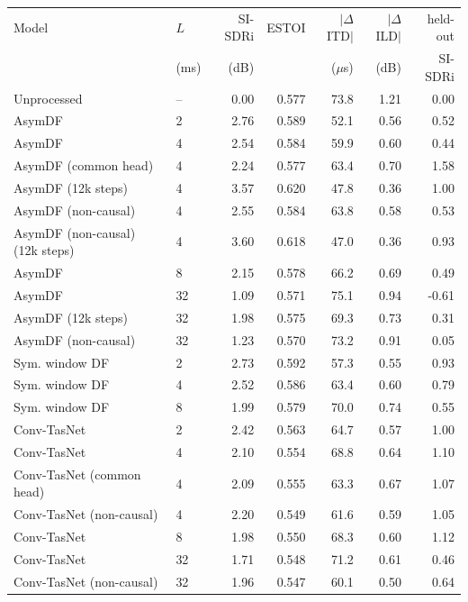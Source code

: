 \begin{tabular}{llrrrrr}
\toprule
Model & $L$ & SI-SDRi & ESTOI & $|\Delta$ITD$|$ & $|\Delta$ILD$|$ & held-out \\
 & (ms) & (dB) & & ($\mu$s) & (dB) & SI-SDRi \\
\midrule
Unprocessed & -- & 0.00 & 0.577 & 73.8 & 1.21 & 0.00 \\
AsymDF & 2 & 2.76 & 0.589 & 52.1 & 0.56 & 0.52 \\
AsymDF & 4 & 2.54 & 0.584 & 59.9 & 0.60 & 0.44 \\
AsymDF (common head) & 4 & 2.24 & 0.577 & 63.4 & 0.70 & 1.58 \\
AsymDF (12k steps) & 4 & 3.57 & 0.620 & 47.8 & 0.36 & 1.00 \\
AsymDF (non-causal) & 4 & 2.55 & 0.584 & 63.8 & 0.58 & 0.53 \\
AsymDF (non-causal) (12k steps) & 4 & 3.60 & 0.618 & 47.0 & 0.36 & 0.93 \\
AsymDF & 8 & 2.15 & 0.578 & 66.2 & 0.69 & 0.49 \\
AsymDF & 32 & 1.09 & 0.571 & 75.1 & 0.94 & -0.61 \\
AsymDF (12k steps) & 32 & 1.98 & 0.575 & 69.3 & 0.73 & 0.31 \\
AsymDF (non-causal) & 32 & 1.23 & 0.570 & 73.2 & 0.91 & 0.05 \\
Sym. window DF & 2 & 2.73 & 0.592 & 57.3 & 0.55 & 0.93 \\
Sym. window DF & 4 & 2.52 & 0.586 & 63.4 & 0.60 & 0.79 \\
Sym. window DF & 8 & 1.99 & 0.579 & 70.0 & 0.74 & 0.55 \\
Conv-TasNet & 2 & 2.42 & 0.563 & 64.7 & 0.57 & 1.00 \\
Conv-TasNet & 4 & 2.10 & 0.554 & 68.8 & 0.64 & 1.10 \\
Conv-TasNet (common head) & 4 & 2.09 & 0.555 & 63.3 & 0.67 & 1.07 \\
Conv-TasNet (non-causal) & 4 & 2.20 & 0.549 & 61.6 & 0.59 & 1.05 \\
Conv-TasNet & 8 & 1.98 & 0.550 & 68.3 & 0.60 & 1.12 \\
Conv-TasNet & 32 & 1.71 & 0.548 & 71.2 & 0.61 & 0.46 \\
Conv-TasNet (non-causal) & 32 & 1.96 & 0.547 & 60.1 & 0.50 & 0.64 \\
\bottomrule
\end{tabular}
